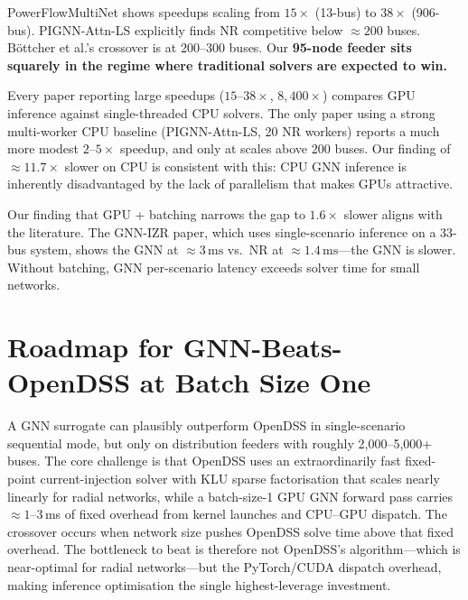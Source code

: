\documentclass[11pt]{article}
\begin{document}
\begin{description}[style=unboxed, leftmargin=0pt, labelwidth=0pt]

  \item[\textbf{Network size is the dominant variable.}]
  PowerFlowMultiNet shows speedups scaling from $15\times$ (13-bus) to
  $38\times$ (906-bus).  PIGNN-Attn-LS explicitly finds NR competitive below
  ${\approx}200$ buses.  B\"{o}ttcher et al.'s crossover is at 200--300 buses.
  Our \textbf{95-node feeder sits squarely in the regime where traditional
  solvers are expected to win.}

  \item[\textbf{GPU-vs-CPU comparisons inflate speedup ratios.}]
  Every paper reporting large speedups ($15$--$38\times$, $8{,}400\times$)
  compares GPU inference against single-threaded CPU solvers.  The only paper
  using a strong multi-worker CPU baseline (PIGNN-Attn-LS, 20 NR workers)
  reports a much more modest $2$--$5\times$ speedup, and only at scales above
  200 buses.  Our finding of ${\approx}11.7\times$ slower on CPU is consistent with this:
  CPU GNN inference is inherently disadvantaged by the lack of parallelism
  that makes GPUs attractive.

  \item[\textbf{Batching is essential for GNN competitiveness.}]
  Our finding that GPU + batching narrows the gap to $1.6\times$ slower aligns
  with the literature.  The GNN-IZR paper, which uses single-scenario inference
  on a 33-bus system, shows the GNN at ${\approx}3\,\text{ms}$ vs.\ NR at
  ${\approx}1.4\,\text{ms}$---the GNN is slower.  Without batching, GNN
  per-scenario latency exceeds solver time for small networks.

\end{description}

\section{Roadmap for GNN-Beats-OpenDSS at Batch Size One}
\label{sec:roadmap}

A GNN surrogate can plausibly outperform OpenDSS in single-scenario
sequential mode, but only on distribution feeders with roughly
2,000--5,000+ buses.  The core challenge is that OpenDSS uses an
extraordinarily fast fixed-point current-injection solver with KLU sparse
factorisation that scales nearly linearly for radial networks, while a
batch-size-1 GPU GNN forward pass carries ${\approx}1$--$3$\,ms of fixed
overhead from kernel launches and CPU--GPU dispatch.  The crossover occurs
when network size pushes OpenDSS solve time above that fixed overhead.
The bottleneck to beat is therefore not OpenDSS's algorithm---which is
near-optimal for radial networks---but the PyTorch/CUDA dispatch overhead,
making inference optimisation the single highest-leverage investment.
\end{document}
